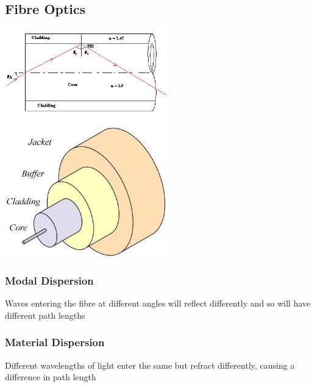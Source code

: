 \documentclass{article}[18pt]
\begin{document}
\subsection{Fibre Optics}
\includegraphics[width=7cm]{Fibre_Optic_1.png}\\
\includegraphics[width=7cm]{Fibre_Optic_2.jpg}\\
\subsubsection{Modal Dispersion}
Waves entering the fibre at different angles will reflect differently and so will have different path lengths
\subsubsection{Material Dispersion}
Different wavelengths of light enter the same but refract differently, causing a difference in path length
\end{document}
